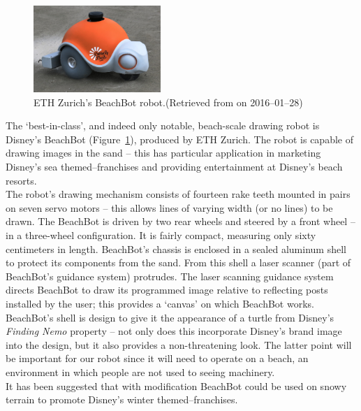     \label{sand-drawing robots}
        \begin{figure}
          \begin{center}
            \includegraphics[width=0.43\textwidth]{Files/beachbot}
          \end{center}
          \caption{ETH Z\:urich's BeachBot robot.{\small (Retrieved from  on 2016--01--28)}}
          \label{fig: beachbot}
        \end{figure}
        The `best-in-class', and indeed only notable, beach-scale drawing robot is Disney's BeachBot (Figure~\ref{fig: beachbot}), produced by ETH Zurich.\cite{beachbot} The robot is capable of drawing images in the sand -- this has particular application in marketing Disney's sea themed--franchises and providing entertainment at Disney's beach resorts.\\
        The robot's drawing mechanism consists of fourteen rake teeth mounted in pairs on seven servo motors -- this allows lines of varying width (or no lines) to be drawn. The BeachBot is driven by two rear wheels and steered by a front wheel -- in a three-wheel configuration. It is fairly compact, measuring only sixty centimeters in length. BeachBot's chassis is enclosed in a sealed aluminum shell to protect its components from the sand. From this shell a laser scanner (part of BeachBot's guidance system) protrudes. The laser scanning guidance system directs BeachBot to draw its programmed image relative to reflecting posts installed by the user; this provides a `canvas' on which BeachBot works.\\
        BeachBot's shell is design to give it the appearance of a  turtle from Disney's \emph{Finding Nemo} property -- not only does this incorporate Disney's brand image into the design, but it also provides a non-threatening look. The latter point will be important for our robot since it will need to operate on a beach, an environment in which people are not used to seeing machinery.\\
        It has been suggested that with modification BeachBot could be used on snowy terrain to promote Disney's winter themed--franchises.

